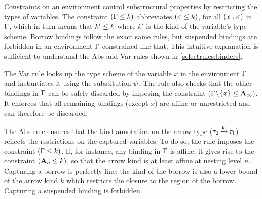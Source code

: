 
Constraints on an environment control substructural properties by
restricting the types of variables.  The constraint $(\Gamma \leq k)$
abbreviates $(\sigma \leq k)$, for all $(x : \sigma)$
in $\Gamma$, which in turn means that $k' \leq k$ where $k'$ is the kind of
the variable's type scheme.
Borrow bindings follow the exact same rules, but suspended bindings
are forbidden in an environment $\Gamma$ constrained like that.
This intuitive explanation is sufficient to understand
the {\sc Abs} and {\sc Var} rules shown in
\cref{selectrules:binders}.

The {\sc Var} rule looks up the type scheme of the variable $x$ in
the environment $\Gamma$
and instantiates it using the substitution $\mathrm{\psi}$. The rule also
checks that the other bindings in $\Gamma$ can be safely discarded by
imposing the constraint $(\Gamma\!\setminus\!\{x\} \leq \mathbf{A}_\infty)$.
It enforces that all remaining bindings (except $x$) are affine or
unrestricted and can therefore be discarded.

The {\sc Abs} rule ensures that the kind annotation on the arrow type
($\tau_2 \operatorname{\xrightarrow{k}} \tau_1$) reflects the restrictions on the captured variables.
To do so, the rule imposes the constraint $(\Gamma \leq k)$.
If, for instance, any binding in $\Gamma$ is affine, it gives rise to the
constraint $(\mathbf{A}_n \leq k)$, so that  the arrow kind is at least
affine at nesting level $n$.
Capturing a borrow is perfectly fine: the kind of the borrow is also a
lower bound of the arrow kind $k$ which restricts the closure
to the region of the borrow.
Capturing a suspended binding is forbidden.




